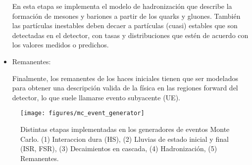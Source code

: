 \begin{itemize}
  En esta etapa se implementa el modelo de hadronización que describe la formación de
  mesones y bariones a partir de los quarks y gluones. También las partículas
  inestables deben decaer a partículas (cuasi) estables que son detectadas en el
  detector, con tasas y distribuciones que estén de acuerdo con los valores
  medidos o predichos.

\item Remanentes:

  Finalmente, los remanentes de los haces iniciales tienen que ser
  modelados para obtener una descripción valida de la física en las regiones
  forward del detector, lo que suele llamarse evento subyacente (UE).

\end{itemize}

\begin{figure}[h]
  \centering
  \texttt{[image: figures/mc\_event\_generator]}
  \caption{Distintas etapas implementadas en los generadores de eventos Monte Carlo.
    (1) Interaccion dura (HS), (2) Lluvias de estado inicial y final (ISR, FSR),
    (3) Decaimientos en cascada, (4) Hadronización, (5) Remanentes.}
  \label{fig:mc_event_generator}
\end{figure}









